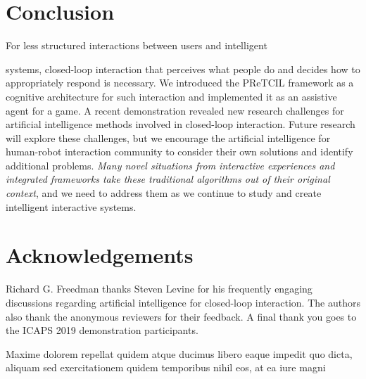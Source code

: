 \documentclass[letterpaper]{article} %
\begin{document}




\section{Conclusion\label{sec:conclusion}}
For less structured interactions between users and intelligent

\noindent systems, closed-loop interaction that perceives what people do and decides how to appropriately respond is necessary.  We introduced the {\sc PReTCIL} framework as a cognitive architecture for such interaction and implemented it as an assistive agent for a game.  A recent demonstration %
 revealed new research challenges for artificial intelligence methods involved in closed-loop interaction. %
 Future research will explore these challenges, but we encourage the artificial intelligence for human-robot interaction community to consider their own solutions and identify additional problems.  \textit{Many novel situations from interactive experiences and integrated frameworks take these traditional algorithms out of their original context}, and we need to address them as we continue to study and create intelligent interactive systems.

 \section*{Acknowledgements} Richard G. Freedman thanks Steven Levine for his frequently engaging discussions regarding artificial intelligence for closed-loop interaction.  The authors also thank the anonymous reviewers for their feedback.  A final thank you goes to the ICAPS 2019 demonstration participants.  %

Maxime dolorem repellat quidem atque ducimus libero eaque impedit quo dicta, aliquam sed exercitationem quidem temporibus nihil eos, at ea iure magni


\end{document}
